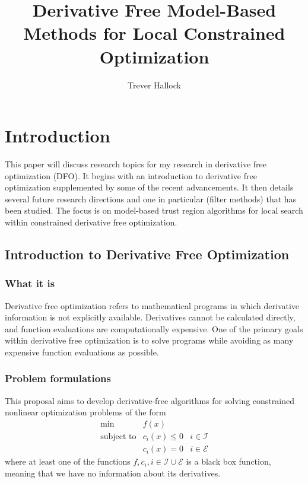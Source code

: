 \documentclass{article}
\title{Derivative Free Model-Based Methods for Local Constrained Optimization}
\author{Trever Hallock}
\begin{document}
%
\algnewcommand{\Goto}{\algorithmicgoto\xspace}%
\algnewcommand{\Label}{\State\unskip}


\maketitle


\tableofcontents

\newpage

\section{Introduction}

This paper will discuss research topics for my research in derivative free optimization (DFO).
It begins with an introduction to derivative free optimization supplemented by some of the recent advancements.
It then details several future research directions and one in particular (filter methods) that has been studied.
The focus is on model-based trust region algorithms for local search within constrained derivative free optimization.

\subsection{Introduction to Derivative Free Optimization}
\subsubsection{What it is}

Derivative free optimization refers to mathematical programs in which derivative information is not explicitly available.
Derivatives cannot be calculated directly, and function evaluations are computationally expensive.
One of the primary goals within derivative free optimization is to solve programs while avoiding as many expensive function evaluations as possible.


\subsubsection{Problem formulations}

This proposal aims to develop derivative-free algorithms for solving constrained nonlinear optimization problems of the form
\[ \begin{array}{ccl} \min & f(x) \\
\mbox{subject to} & c_i(x) \le 0 & i \in \mathcal{I} \\
& c_i(x) = 0 & i \in \mathcal{E}
\end{array}
\]
where at least one of the functions $f, c_i, i \in \mathcal{I} \cup \mathcal{E}$ is a black box function, meaning that we have no information about its derivatives.
\end{document}
